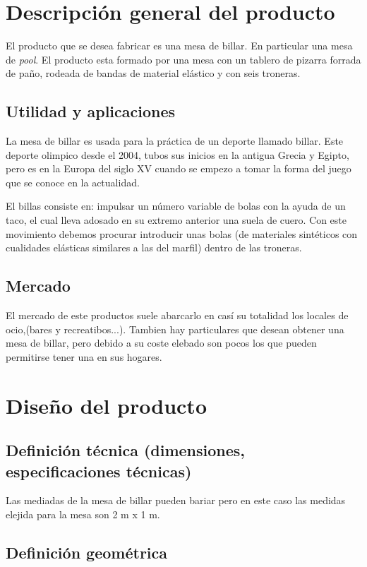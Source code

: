 \section {Descripción general del producto}
	El producto que se desea fabricar es una mesa de billar. En particular una mesa de \emph{pool}.
El producto esta formado por una  mesa con un tablero de pizarra forrada de paño, rodeada de bandas de material elástico y con seis troneras. 
	
	\subsection {Utilidad y aplicaciones}
	La mesa de billar es usada para la práctica de un deporte llamado billar. Este deporte olimpico desde el 2004, tubos sus inicios en la 
 antigua  Grecia y Egipto, pero es en la Europa del siglo XV cuando se empezo a tomar la forma del juego que se conoce en la actualidad. 

El billas consiste en: impulsar un número variable de bolas con la ayuda de un taco,  el cual lleva adosado en su extremo anterior una suela de cuero.
Con este movimiento debemos procurar introducir unas bolas (de materiales sintéticos con cualidades elásticas similares a las del marfil) dentro de las troneras.

	\subsection {Mercado}

El mercado de este productos suele abarcarlo en casí su totalidad los locales de ocio,(bares y recreatibos...). Tambien hay particulares que desean obtener una
mesa de billar, pero debido a su coste elebado son pocos los que pueden permitirse tener una en sus hogares. 
    
\section {Diseño del producto}

	\subsection {Definición técnica (dimensiones, especificaciones técnicas)}
Las mediadas de la mesa de billar pueden bariar pero en este caso las medidas elejida para la mesa son  2 m x 1 m.
	\subsection {Definición geométrica}

